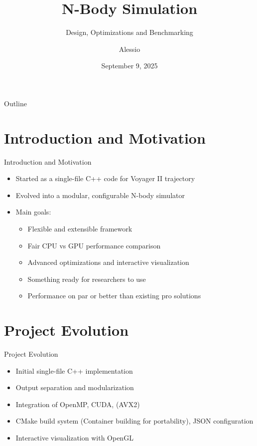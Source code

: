 \documentclass{beamer}
\title{N-Body Simulation}
\subtitle{Design, Optimizations and Benchmarking}
\author[Alessio]{Alessio}
\institute{M. Sc. Physics of Data, University of Padova}
\date{September 9, 2025}
\begin{document}
\frame{\titlepage}

\begin{frame}{Outline}
    \tableofcontents
\end{frame}



\section{Introduction and Motivation}
\begin{frame}{Introduction and Motivation}
    \begin{itemize}
        \item Started as a single-file C++ code for Voyager II trajectory
        \item Evolved into a modular, configurable N-body simulator
        \item Main goals:
        \begin{itemize}
            \item Flexible and extensible framework
            \item Fair CPU vs GPU performance comparison
            \item Advanced optimizations and interactive visualization
            \item Something ready for researchers to use
            \item Performance on par or better than existing pro solutions 
        \end{itemize}
    \end{itemize}
\end{frame}

\section{Project Evolution}
\begin{frame}{Project Evolution}
    \begin{itemize}
        \item Initial single-file C++ implementation
        \item Output separation and modularization
        \item Integration of OpenMP, CUDA, (AVX2)
        \item CMake build system (Container building for portability), JSON configuration
        \item Interactive visualization with OpenGL
    \end{itemize}
\end{frame}
\end{document}
